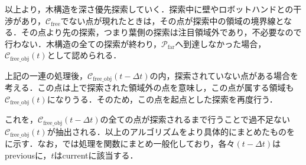 \documentclass[a4paper,twoside,12pt,papersize, dvipdfmx]{iirthesis}
\begin{document}
以上より，木構造を深さ優先探索していく．探索中に壁やロボットハンドとの干渉があり，$\mathcal{C}_{\mathrm{free}}$でない点が現れたときは，その点が探索中の領域の境界線となる．その点より先の探索，つまり葉側の探索は注目領域外であり，不必要なので行わない．木構造の全ての探索が終わり，$\mathcal{P}_{\mathrm {far}}$へ到達しなかった場合，$\mathcal{C}_{\mathrm{free\_obj}}(t)$として認められる．\par

上記の一連の処理後，$\mathcal{C}_{\mathrm{free\_obj}}(t-\Delta t)$の内，探索されていない点がある場合を考える．この点は上で探索された領域外の点を意味し，この点が属する領域も$\mathcal{C}_{\mathrm{free\_obj}}(t)$になりうる．そのため，この点を起点とした探索を再度行う．\par

これを，$\mathcal{C}_{\mathrm{free\_obj}}(t-\Delta t)$の全ての点が探索されるまで行うことで過不足ない$\mathcal{C}_{\mathrm{free\_obj}}(t)$が抽出される．以上のアルゴリズムをより具体的にまとめたものをに示す．なお，では処理を関数にまとめ一般化しており，各々$(t-\Delta t)$はpreviousに，$t$はcurrentに該当する．
\end{document}
